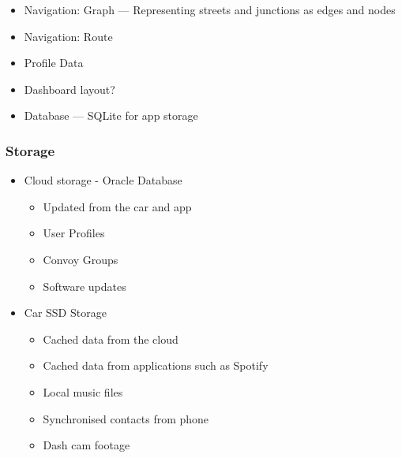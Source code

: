 \documentclass{article}
\begin{document}
  \begin{itemize}
      \item Navigation: Graph --- Representing streets and junctions as edges and nodes
      \item Navigation: Route
	  \item Profile Data
      \item Dashboard layout?
      \item Database --- SQLite for app storage    
  \end{itemize}

\subsubsection{Storage}
  \begin{itemize}
      \item Cloud storage - Oracle Database
          \begin{itemize}
          	  \item Updated from the car and app
              \item User Profiles
              \item Convoy Groups
              \item Software updates
          \end{itemize}
      \item Car SSD Storage
      \begin{itemize}
      		\item Cached data from the cloud
            \item Cached data from applications such as Spotify
            \item Local music files
            \item Synchronised contacts from phone
            \item Dash cam footage
      \end{itemize}
  \end{itemize}
\end{document}
